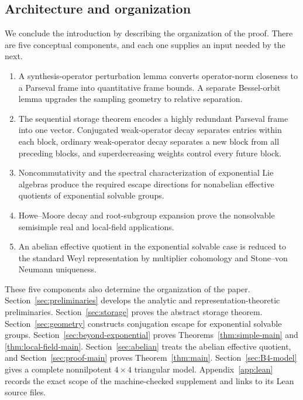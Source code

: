 \documentclass[10pt,a4paper]{amsart}
\numberwithin{equation}{section}
\begin{document}
\subsection{Architecture and organization}

We conclude the introduction by describing the organization of the proof.
There are five conceptual components, and each one supplies an input needed
by the next.
\begin{enumerate}[label=\textnormal{\textbf{Step \arabic*.}},leftmargin=*]
\item A synthesis-operator perturbation lemma converts operator-norm
closeness to a Parseval frame into quantitative frame bounds.  A separate
Bessel-orbit lemma upgrades the sampling geometry to relative separation.
\item The sequential storage theorem encodes a highly redundant Parseval
frame into one vector.  Conjugated weak-operator decay separates entries
within each block, ordinary weak-operator decay separates a new block from
all preceding blocks, and superdecreasing weights control every future block.
\item Noncommutativity and the spectral characterization of exponential Lie
algebras produce the required escape directions for nonabelian effective
quotients of exponential solvable groups.
\item Howe--Moore decay and root-subgroup expansion prove the nonsolvable
semisimple real and local-field applications.
\item An abelian effective quotient in the exponential solvable case is
reduced to the standard Weyl representation by multiplier cohomology and
Stone--von Neumann uniqueness.
\end{enumerate}

These five components also determine the organization of the paper.
Section~\ref{sec:preliminaries} develops the analytic and
representation-theoretic preliminaries.  Section~\ref{sec:storage} proves the
abstract storage theorem.  Section~\ref{sec:geometry} constructs conjugation
escape for exponential solvable groups.  Section~\ref{sec:beyond-exponential}
proves Theorems~\ref{thm:simple-main} and \ref{thm:local-field-main}.
Section~\ref{sec:abelian} treats the
abelian effective quotient, and Section~\ref{sec:proof-main} proves
Theorem~\ref{thm:main}.  Section~\ref{sec:B4-model} gives a complete
nonnilpotent $4\times4$ triangular model.  Appendix~\ref{app:lean} records the exact scope of
the machine-checked supplement and links to its Lean source files.
\end{document}
